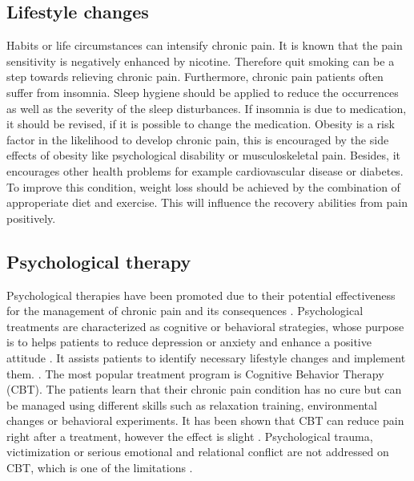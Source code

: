 \subsection{Lifestyle changes}
Habits or life circumstances can intensify chronic pain. It is known that the pain sensitivity is negatively enhanced by nicotine. Therefore quit smoking can be a step towards relieving chronic pain.
Furthermore, chronic pain patients often suffer from insomnia. Sleep hygiene should be applied to reduce the occurrences as well as the severity of the sleep disturbances. If insomnia is due to medication, it should be revised, if it is possible to change the medication.
Obesity is a risk factor in the likelihood to  develop chronic pain, this is encouraged by the side effects of obesity like psychological disability or musculoskeletal pain. Besides, it encourages other health problems for example cardiovascular disease or diabetes. To improve this condition, weight loss should be achieved by the combination of approperiate diet and exercise. This will influence the recovery abilities from pain positively. \cite{marcus2009,pope2017}

\subsection{Psychological therapy}

Psychological therapies have been promoted due to their potential effectiveness for the management of chronic pain and its consequences \cite{Eccleston2002}. Psychological treatments are characterized as cognitive or behavioral strategies, whose purpose is to helps patients to reduce depression or anxiety and enhance a positive attitude \cite{Eccleston2013}. It assists patients to identify necessary lifestyle changes and implement them. \cite{marcus2009,pope2017}. The most popular treatment program is Cognitive Behavior Therapy (CBT). The patients learn that their chronic pain condition has no cure but can be managed using different skills such as relaxation training, environmental changes or behavioral experiments. \cite{Burger2016} It has been shown that CBT can reduce pain right after a treatment, however the effect is slight \cite{Eccleston2013}. Psychological trauma, victimization or serious emotional and relational conflict are not addressed on CBT, which is one of the limitations \cite{Burger2016}.


